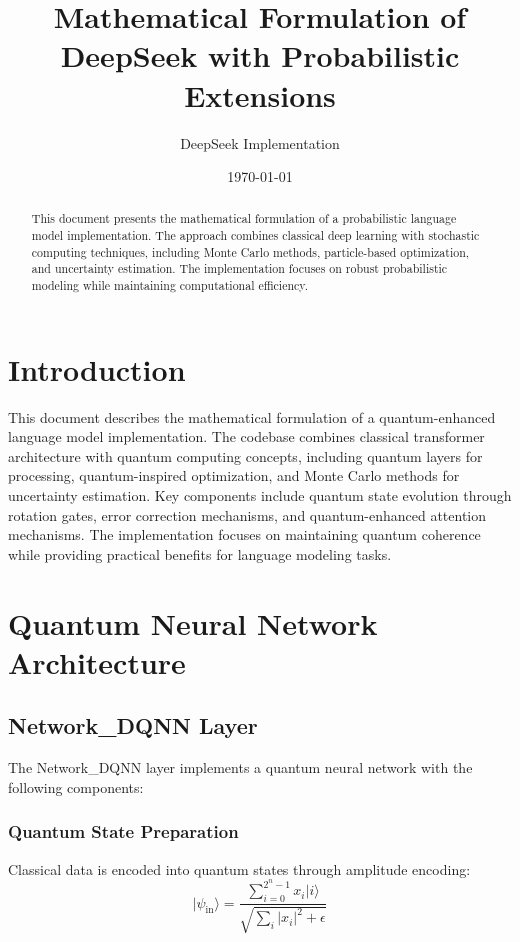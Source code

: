 \documentclass{article}
\title{Mathematical Formulation of DeepSeek with Probabilistic Extensions}
\author{DeepSeek Implementation}
\date{\today}
\begin{document}
\maketitle

\begin{abstract}
This document presents the mathematical formulation of a probabilistic language model implementation. The approach combines classical deep learning with stochastic computing techniques, including Monte Carlo methods, particle-based optimization, and uncertainty estimation. The implementation focuses on robust probabilistic modeling while maintaining computational efficiency.
\end{abstract}

\section*{Introduction}
This document describes the mathematical formulation of a quantum-enhanced language model implementation. The codebase combines classical transformer architecture with quantum computing concepts, including quantum layers for processing, quantum-inspired optimization, and Monte Carlo methods for uncertainty estimation. Key components include quantum state evolution through rotation gates, error correction mechanisms, and quantum-enhanced attention mechanisms. The implementation focuses on maintaining quantum coherence while providing practical benefits for language modeling tasks.

\section{Quantum Neural Network Architecture}

\subsection{Network_DQNN Layer}
The Network_DQNN layer implements a quantum neural network with the following components:

\subsubsection{Quantum State Preparation}
Classical data is encoded into quantum states through amplitude encoding:
\begin{equation}
|\psi_{\text{in}}\rangle = \frac{\sum_{i=0}^{2^n-1} x_i|i\rangle}{\sqrt{\sum_i |x_i|^2 + \epsilon}}
\end{equation}
\end{document}
